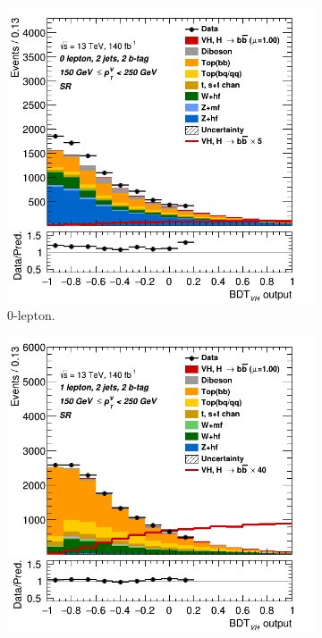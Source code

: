 \begin{figure}[h!]
  \centering
  \begin{subfigure}[b]{0.32\textwidth}
      \centering
      \includegraphics[width=\textwidth]{Images/VH/Own_fit/prefit_VHbb/Region_distmva_BMax250_BMin150_DSR_J2_TTypebb_T2_L0_Y6051_Prefit.png}
      \caption{0-lepton.}
      \label{fig:plots_VHbb_ex_OL_SR}
  \end{subfigure}
  \begin{subfigure}[b]{0.32\textwidth}
      \centering
      \includegraphics[width=\textwidth]{Images/VH/Own_fit/prefit_VHbb/Region_distmva_BMax250_BMin150_DSR_J2_TTypebb_T2_L1_Y6051_Prefit.png}

\end{subfigure}
\end{figure}
